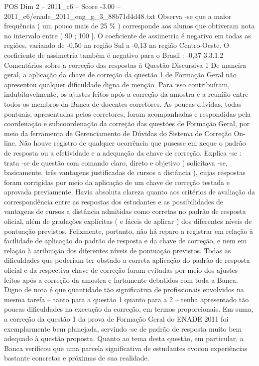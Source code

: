 \begin{textsample}{POS Dim 2 – 2011\_c6 – Score -3.00 – 2011\_c6/enade\_2011\_eng\_g\_3\_88b71d4d48.txt}
Observa -se que a maior frequência ( um pouco mais de 25 \% ) corresponde aos alunos que obtiveram nota no intervalo entre ( 90 ; 100 ].
O coeficiente de assimetria é negativo em todas as regiões, variando de -0,50 na região Sul a -0,13 na região Centro-Oeste.
O coeficiente de assimetria também é negativo para o Brasil : -0,37 3.3.1.2 Comentários sobre a correção das respostas à Questão Discursiva 1 De maneira geral, a aplicação da chave de correção da questão 1 de Formação Geral não apresentou qualquer dificuldade digna de menção.
Para isso contribuíram, indubitavelmente, os ajustes feitos após a correção da amostra e a reunião entre todos os membros da Banca de docentes corretores.
As poucas dúvidas, todas pontuais, apresentadas pelos corretores, foram acompanhadas e respondidas pela coordenação e subcoordenação da correção das questões de Formação Geral, por meio da ferramenta de Gerenciamento de Dúvidas do Sistema de Correção On-line.
Não houve registro de qualquer ocorrência que pusesse em xeque o padrão de resposta ou a efetividade e a adequação da chave de correção.
Explica -se : trata -se de questão com comando claro, direto e objetivo ( solicitava -se, basicamente, três vantagens justificadas de cursos a distância ), cujas respostas foram corrigidas por meio da aplicação de um chave de correção testada e aprovada previamente.
Havia absoluta clareza quanto aos critérios de avaliação da correspondência entre as respostas dos estudantes e as possibilidades de vantagens de cursos a distância admitidas como corretas no padrão de resposta oficial, além de gradações explícitas ( e fáceis de aplicar ) dos diferentes níveis de pontuação previstos.
Felizmente, portanto, não há reparo a registrar em relação à facilidade de aplicação do padrão de resposta e da chave de correção, e nem em relação à atribuição dos diferentes níveis de pontuação previstos.
Todas as dificuldades que poderiam ter obstado a correta aplicação do padrão de resposta oficial e da respectiva chave de correção foram evitadas por meio dos ajustes feitos após a correção da amostra e fartamente debatidos com toda a Banca.
Digno de nota é que quantidade tão significativa de profissionais envolvidos na mesma tarefa – tanto para a questão 1 quanto para a 2 – tenha apresentado tão poucas dificuldades na execução da correção, em termos proporcionais.
Em suma, a correção da questão 1 da prova de Formação Geral do ENADE 2011 foi exemplarmente bem planejada, servindo -se de padrão de resposta muito bem adequado à questão proposta.
Quanto ao tema desta questão, em particular, a Banca verificou que uma parcela significativa de estudantes evocou experiências bastante concretas e próximas de sua realidade.

\end{textsample}
